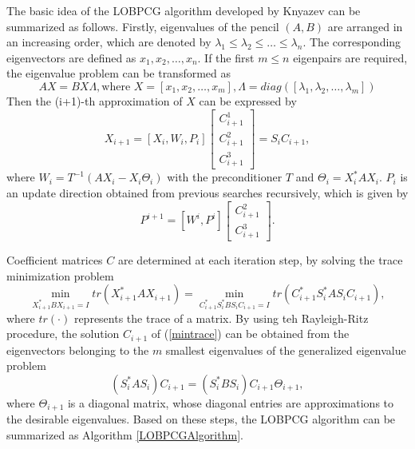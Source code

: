 \documentclass[12pt]{article}
\numberwithin{figure}{section}
\numberwithin{table}{section}
\begin{document}
The basic idea of the LOBPCG algorithm developed by Knyazev can be summarized as follows. Firstly, eigenvalues of the pencil $(A,B)$ are arranged in an increasing order, which are denoted by $\lambda_1\leq\lambda_2\leq\dots\leq\lambda_n$. The corresponding eigenvectors are defined as $x_1,x_2,\dots,x_n$. If the first $m\leq n$ eigenpairs are required, the eigenvalue problem can be transformed as
\begin{equation}
	AX=BX\Lambda, \text{where } X=[x_1,x_2,\dots,x_m], \Lambda=diag([\lambda_1,\lambda_2,\dots,\lambda_m])
\end{equation}
Then the (i+1)-th approximation of $X$ can be expressed by
\begin{equation}
	X_{i+1} = [X_{i},W_{i},P_{i}]\begin{bmatrix}C^1_{i+1}\\C^2_{i+1}\\C^3_{i+1}\end{bmatrix}=S_i C_{i+1},
\end{equation}
where $W_i=T^{-1}(AX_i-X_i\Theta_i)$ with the preconditioner $T$ and $\Theta_i = X_i^* AX_i$. $P_i$ is an update direction obtained from previous searches recursively, which is given by
\begin{equation}
	P^{i+1}=[W^i,P^i]\begin{bmatrix}C_{i+1}^2\\C_{i+1}^3\end{bmatrix}.
\end{equation}

Coefficient matrices $C$ are determined at each iteration step, by solving the trace minimization problem
\begin{equation}
	\label{mintrace}
	\min_{X_{i+1}^* BX_{i+1}=I} tr(X_{i+1}^* AX_{i+1}) =  \min_{C_{i+1}^{*}S_{i}^{*}BS_{i}C_{i+1}=I} tr(C_{i+1}^* S_i^* AS_i C_{i+1}),
\end{equation}
where $tr(\cdot)$ represents the trace of a matrix. By using teh Rayleigh-Ritz procedure, the solution $C_{i+1}$ of (\ref{mintrace}) can be obtained from the eigenvectors belonging to the $m$ smallest eigenvalues of the generalized eigenvalue problem 
\begin{equation}
	(S_{i}^* A S_{i}) C_{i+1} = (S^{*}_{i}BS_{i}) C_{i+1}\Theta_{i+1},
\end{equation}
where $\Theta_{i+1}$ is a diagonal matrix, whose diagonal entries are approximations to the desirable eigenvalues. Based on these steps, the LOBPCG algorithm can be summarized as Algorithm \ref{LOBPCGAlgorithm}.
\end{document}

